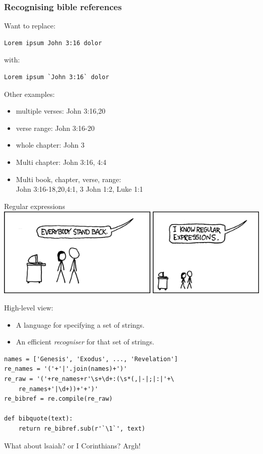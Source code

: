 \documentclass{beamer}
\begin{document}
    \begin{frame}[fragile]
        \frametitle{Recognising bible references}
         Want to replace:\\
         \begin{verbatim}Lorem ipsum John 3:16 dolor
\end{verbatim}
         with:\\
         \begin{verbatim}Lorem ipsum `John 3:16` dolor
\end{verbatim}
Other examples:
\begin{itemize}
\item multiple verses: John 3:16,20
\item verse range: John 3:16-20
\item whole chapter: John 3
\item Multi chapter: John 3:16, 4:4
\item Multi book, chapter, verse, range:\\
    John 3:16-18,20,4:1, 3 John 1:2, Luke 1:1
\end{itemize}
\end{frame}

\begin{frame}{Regular expressions}
    \includegraphics[keepaspectratio=true, width=0.9\paperwidth]{regular_expressions.png}

High-level view:
\begin{itemize}
\item A language for specifying a set of strings.
\item An efficient \emph{recogniser} for that set of strings.
\end{itemize}

\end{frame}



\begin{frame}[fragile]
    
\begin{verbatim}
names = ['Genesis', 'Exodus', ..., 'Revelation']
re_names = '('+'|'.join(names)+')'
re_raw = '('+re_names+r'\s+\d+:(\s*(,|-|;|:|'+\
    re_names+'|\d+))+'+')'
re_bibref = re.compile(re_raw)

def bibquote(text):
    return re_bibref.sub(r'`\1`', text)
\end{verbatim}

What about lsaiah? or I Corinthians? Argh!

\end{frame}
\end{document}
